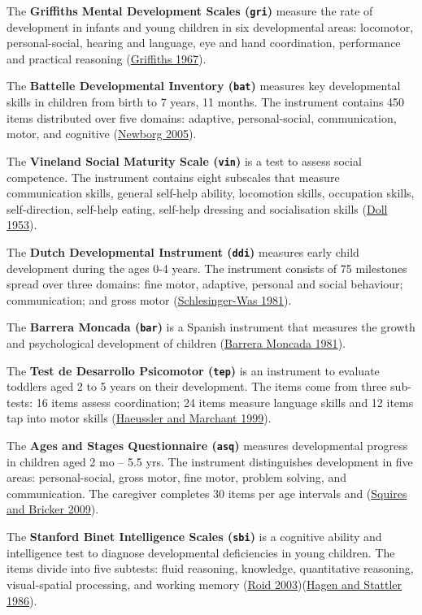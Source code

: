 \documentclass[
]{book}
\begin{document}
The \textbf{Griffiths Mental Development Scales (\texttt{gri})} measure the rate of development in infants and young children in six developmental areas: locomotor, personal-social, hearing and language, eye and hand coordination, performance and practical reasoning (\protect\hyperlink{ref-griffiths1967}{Griffiths 1967}).

The \textbf{Battelle Developmental Inventory (\texttt{bat})} measures key developmental skills in children from birth to 7 years, 11 months. The instrument contains 450 items distributed over five domains: adaptive, personal-social, communication, motor, and cognitive (\protect\hyperlink{ref-newborg2005}{Newborg 2005}).

The \textbf{Vineland Social Maturity Scale (\texttt{vin})} is a test to assess social competence. The instrument contains eight subscales that measure communication skills, general self-help ability, locomotion skills, occupation skills, self-direction, self-help eating, self-help dressing and socialisation skills (\protect\hyperlink{ref-doll1953}{Doll 1953}).

The \textbf{Dutch Developmental Instrument (\texttt{ddi})} measures early child development during the ages 0-4 years. The instrument consists of 75 milestones spread over three domains: fine motor, adaptive, personal and social behaviour; communication; and gross motor (\protect\hyperlink{ref-schlesinger1981}{Schlesinger-Was 1981}).

The \textbf{Barrera Moncada (\texttt{bar})} is a Spanish instrument that measures the growth and psychological development of children (\protect\hyperlink{ref-barrera1981}{Barrera Moncada 1981}).

The \textbf{Test de Desarrollo Psicomotor (\texttt{tep})} is an instrument to evaluate toddlers aged 2 to 5 years on their development. The items come from three sub-tests: 16 items assess coordination; 24 items measure language skills and 12 items tap into motor skills (\protect\hyperlink{ref-haeussler1999}{Haeussler and Marchant 1999}).

The \textbf{Ages and Stages Questionnaire (\texttt{asq})} measures developmental progress in children aged 2 mo -- 5.5 yrs. The instrument distinguishes development in five areas: personal-social, gross motor, fine motor, problem solving, and communication. The caregiver completes 30 items per age intervals and (\protect\hyperlink{ref-squires2009}{Squires and Bricker 2009}).

The \textbf{Stanford Binet Intelligence Scales (\texttt{sbi})} is a cognitive ability and intelligence test to diagnose developmental deficiencies in young children. The items divide into five subtests: fluid reasoning, knowledge, quantitative reasoning, visual-spatial processing, and working memory (\protect\hyperlink{ref-roid2003}{Roid 2003})(\protect\hyperlink{ref-hagen1986}{Hagen and Stattler 1986}).
\end{document}
